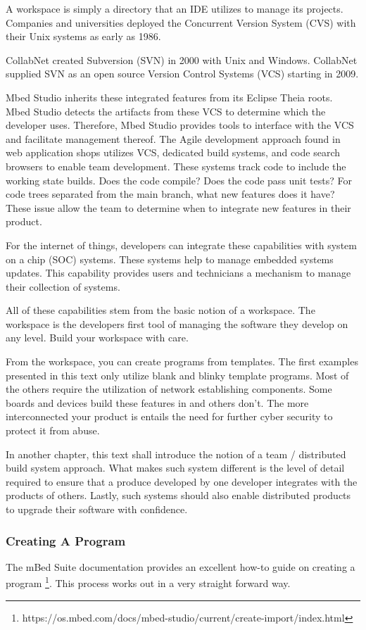 \documentclass{article}
\begin{document}
A workspace is simply a directory that an IDE utilizes to manage its projects.  Companies and universities deployed the Concurrent Version System (CVS) with their Unix systems as early as 1986.  

CollabNet created Subversion (SVN) in 2000 with Unix and Windows.  CollabNet supplied SVN as an open source  Version Control Systems (VCS) starting in 2009.

Mbed Studio inherits these integrated features from its Eclipse Theia roots.
Mbed Studio detects the artifacts from these VCS to determine which the developer uses. Therefore, Mbed Studio provides tools to interface with the VCS and facilitate management thereof.  The Agile development approach found in web application shops utilizes VCS, dedicated build systems, and code search browsers to enable team development.  These systems track code to include the working state builds.  Does the code compile?  Does the code pass unit tests?  For code trees separated from the main branch, what new features does it have?   These issue allow the team to determine when to integrate new features in their product.

For the internet of things, developers can integrate these capabilities with system on a chip (SOC) systems.  These systems help to manage embedded systems updates.  This capability provides users and technicians a mechanism to manage their collection of systems. 

All of these capabilities stem from the basic notion of a workspace.  The workspace is the developers first tool of managing the software they develop on any level.  Build your workspace with care.

From the workspace, you can create programs from templates.  The first examples presented in this text only utilize blank and blinky template programs.  Most of the others require the utilization of network establishing components.  Some boards and devices build these features in and others don't.  The more interconnected your product is entails the need for further cyber security to protect it from abuse.

In another chapter, this text shall introduce the notion of a team / distributed build system approach.  What makes such system different is the level of detail required to ensure that a produce developed by one developer integrates with the products of others.  Lastly, such systems should also enable distributed products to upgrade their software with confidence. 


\subsubsection{Creating A Program} %
\label{ssub:creating_a_program}
The mBed Suite documentation provides an excellent how-to guide on creating a program \footnote{https://os.mbed.com/docs/mbed-studio/current/create-import/index.html}.   This process works out in a very straight forward way.  
\end{document}
